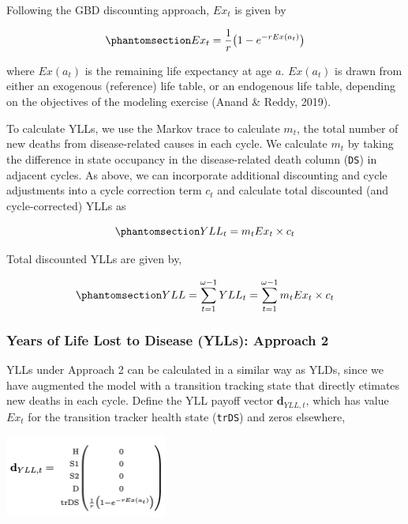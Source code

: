 \documentclass[
]{agujournal2019}
\begin{document}
Following the GBD discounting approach, \(Ex_{t}\) is given by

\begin{equation}\phantomsection\label{eq-pvEx}{
Ex_{t} = \frac{1}{r}\big (1 - e^{-rEx(a_{t})} \big )
}\end{equation}

where \(Ex(a_t)\) is the remaining life expectancy at age \(a\).
\(Ex(a_t)\) is drawn from either an exogenous (reference) life table, or
an endogenous life table, depending on the objectives of the modeling
exercise (Anand \& Reddy, 2019).

To calculate YLLs, we use the Markov trace to calculate \(m_t\), the
total number of new deaths from disease-related causes in each cycle. We
calculate \(m_t\) by taking the difference in state occupancy in the
disease-related death column (\texttt{DS}) in adjacent cycles. As above,
we can incorporate additional discounting and cycle adjustments into a
cycle correction term \(c_t\) and calculate total discounted (and
cycle-corrected) YLLs as

\begin{equation}\phantomsection\label{eq-yllt1}{
YLL_t=m_t Ex_t  \times{c_t} 
}\end{equation}

Total discounted YLLs are given by,

\begin{equation}\phantomsection\label{eq-yllcum1}{
YLL=\sum_{t=1}^{\omega-1} YLL_t = \sum_{t=1}^{\omega-1}m_t Ex_{t}  \times{c_t} 
}\end{equation}

\subsubsection{Years of Life Lost to Disease (YLLs): Approach
2}\label{years-of-life-lost-to-disease-ylls-approach-2}

YLLs under Approach 2 can be calculated in a similar way as YLDs, since
we have augmented the model with a transition tracking state that
directly etimates new deaths in each cycle. Define the YLL payoff vector
\(\mathbf{d}_{YLL,t}\), which has value \(Ex_{t}\) for the transition
tracker health state (\texttt{trDS}) and zeros elsewhere,

\begin{center}
\includegraphics[width=0.4\textwidth,height=\textheight]{images/d_yll.png}
\end{center}
\end{document}
